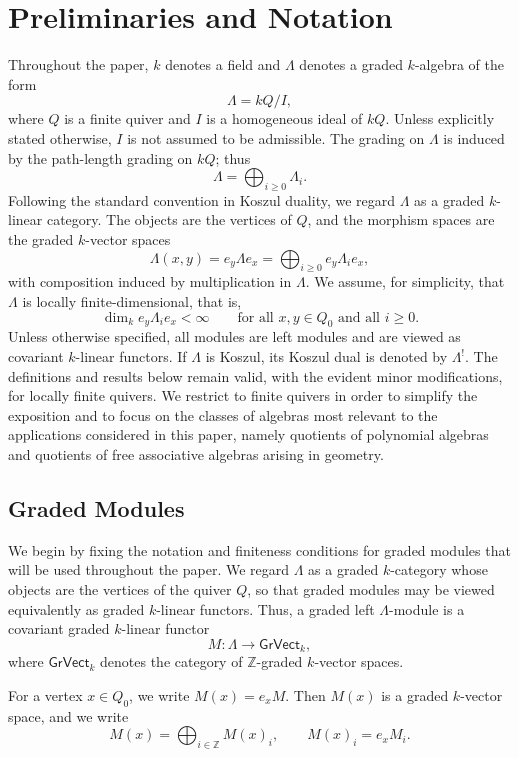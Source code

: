 \documentclass[11pt]{article}
\theoremstyle{definition}
\theoremstyle{remark}
\begin{document}
\section{Preliminaries and Notation}

Throughout the paper, \(k\) denotes a field and \(\Lambda\) denotes a graded \(k\)-algebra of the form \[ \Lambda=kQ/I, \] where \(Q\) is a finite quiver and \(I\) is a homogeneous ideal of \(kQ\). Unless explicitly stated otherwise, \(I\) is not assumed to be admissible. The grading on \(\Lambda\) is induced by the path-length grading on \(kQ\); thus \[ \Lambda=\bigoplus_{i\geq 0}\Lambda_i . \] Following the standard convention in Koszul duality, we regard \(\Lambda\) as a graded \(k\)-linear category. The objects are the vertices of \(Q\), and the morphism spaces are the graded \(k\)-vector spaces \[ \Lambda(x,y) = e_y\Lambda e_x = \bigoplus_{i\geq 0} e_y\Lambda_i e_x , \] with composition induced by multiplication in \(\Lambda\). We assume, for simplicity, that \(\Lambda\) is locally finite-dimensional, that is, \[ \dim_k e_y\Lambda_i e_x<\infty \qquad \text{for all }x,y\in Q_0\text{ and all }i\geq 0 . \] Unless otherwise specified, all modules are left modules and are viewed as covariant \(k\)-linear functors. If \(\Lambda\) is Koszul, its Koszul dual is denoted by \(\Lambda^{!}\). The definitions and results below remain valid, with the evident minor modifications, for locally finite quivers. We restrict to finite quivers in order to simplify the exposition and to focus on the classes of algebras most relevant to the applications considered in this paper, namely quotients of polynomial algebras and quotients of free associative algebras arising in geometry.

\subsection{Graded Modules}

We begin by fixing the notation and finiteness conditions for graded modules that will be used throughout the paper. We regard \(\Lambda\) as
a graded \(k\)-category whose objects are the vertices of the quiver \(Q\), so
that graded modules may be viewed equivalently as graded \(k\)-linear functors.
Thus, a graded left \(\Lambda\)-module is a covariant graded \(k\)-linear
functor
\[
M\colon \Lambda \longrightarrow \mathsf{GrVect}_{k},
\]
where \(\mathsf{GrVect}_{k}\) denotes the category of \(\mathbb{Z}\)-graded
\(k\)-vector spaces.

For a vertex \(x\in Q_0\), we write \(M(x)=e_xM\). Then \(M(x)\) is a graded
\(k\)-vector space, and we write
\[
M(x)=\bigoplus_{i\in\mathbb{Z}} M(x)_i,
\qquad
M(x)_i=e_xM_i .
\]
\end{document}
